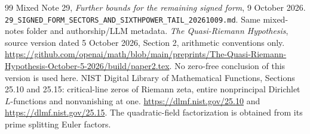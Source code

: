 \documentclass[11pt]{article}
\theoremstyle{definition}
\begin{document}
\begin{thebibliography}{99}
 Mixed Note 29, \emph{Further bounds for the remaining signed form}, 9 October 2026. \nolinkurl{29_SIGNED_FORM_SECTORS_AND_SIXTHPOWER_TAIL_20261009.md}. Same mixed-notes folder and authorship/LLM metadata.
 \emph{The Quasi-Riemann Hypothesis}, source version dated 5 October 2026, Section 2, arithmetic conventions only. \url{https://github.com/openai/math/blob/main/preprints/The-Quasi-Riemann-Hypothesis-October-5-2026/build/paper2.tex}. No zero-free conclusion of this version is used here.
 NIST Digital Library of Mathematical Functions, Sections 25.10 and 25.15: critical-line zeros of Riemann zeta, entire nonprincipal Dirichlet $L$-functions and nonvanishing at one. \url{https://dlmf.nist.gov/25.10} and \url{https://dlmf.nist.gov/25.15}. The quadratic-field factorization is obtained from its prime splitting Euler factors.
\end{thebibliography}
\end{document}
